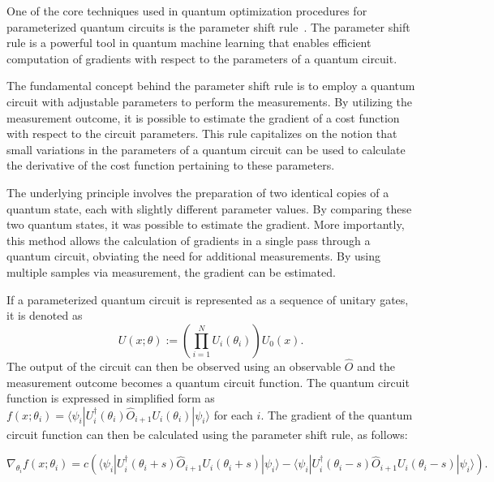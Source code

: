 \documentclass[aps,groupedaddress,superscriptaddress,amssymb,amsmath,amsbsy,amsfonts,twocolumn,pra]{revtex4}
\begin{document}
One of the core techniques used in quantum optimization procedures for parameterized quantum circuits is the parameter shift rule~\cite{MNKF18}. The parameter shift rule is a powerful tool in quantum machine learning that enables efficient computation of gradients with respect to the parameters of a quantum circuit. 

The fundamental concept behind the parameter shift rule is to employ a quantum circuit with adjustable parameters to perform the measurements. By utilizing the measurement outcome, it is possible to estimate the gradient of a cost function with respect to the circuit parameters. This rule capitalizes on the notion that small variations in the parameters of a quantum circuit can be used to calculate the derivative of the cost function pertaining to these parameters.

The underlying principle involves the preparation of two identical copies of a quantum state, each with slightly different parameter values. By comparing these two quantum states, it was possible to estimate the gradient. More importantly, this method allows the calculation of gradients in a single pass through a quantum circuit, obviating the need for additional measurements. By using multiple samples via measurement, the gradient can be estimated.

If a parameterized quantum circuit is represented as a sequence of unitary gates, it is denoted as 
\begin{equation*}
U(x;\theta):= \left(\prod_{i=1}^{N} U_i(\theta_i)\right) U_0(x).
\end{equation*}
The output of the circuit can then be observed using an observable $\hat{O}$ and the measurement outcome becomes a quantum circuit function. The quantum circuit function is expressed in simplified form as $f(x;\theta_i) = \langle\psi_i| U_i^\dagger(\theta_i) \hat{O}_{i+1} U_i(\theta_i) |\psi_i\rangle$ for each $i$. The gradient of the quantum circuit function can then be calculated using the parameter shift rule, as follows:

\begin{widetext}
\begin{equation} \label{eq:psr}
\nabla_{\theta_i} f(x;\theta_i) = c \left(\langle\psi_i| U_i^\dagger(\theta_i+s) \hat{O}_{i+1} U_i(\theta_i+s) |\psi_i\rangle - \langle\psi_i| U_i^\dagger(\theta_i-s) \hat{O}_{i+1} U_i(\theta_i-s) |\psi_i\rangle\right).
\end{equation}
\end{widetext}
\end{document}
